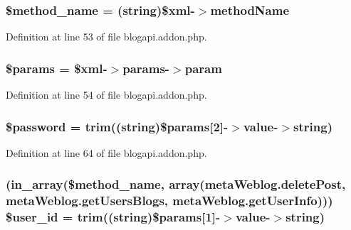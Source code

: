 \subsubsection[{\$method\+\_\+name}]{\setlength{\rightskip}{0pt plus 5cm}\$method\+\_\+name = (string)\$xml-\/$>$method\+Name}\label{blogapi_8addon_8php_a88c34f4701e451bbcef63e44e5902ebd}


Definition at line 53 of file blogapi.\+addon.\+php.

\hypertarget{blogapi_8addon_8php_afe68e6fbe7acfbffc0af0c84a1996466}{}
\subsubsection[{\$params}]{\setlength{\rightskip}{0pt plus 5cm}\$params = \$xml-\/$>$params-\/$>$param}\label{blogapi_8addon_8php_afe68e6fbe7acfbffc0af0c84a1996466}


Definition at line 54 of file blogapi.\+addon.\+php.

\hypertarget{blogapi_8addon_8php_a607686ef9f99ea7c42f4f3dd3dbb2b0d}{}
\subsubsection[{\$password}]{\setlength{\rightskip}{0pt plus 5cm}\$password = trim((string)\$params\mbox{[}2\mbox{]}-\/$>$value-\/$>$string)}\label{blogapi_8addon_8php_a607686ef9f99ea7c42f4f3dd3dbb2b0d}


Definition at line 64 of file blogapi.\+addon.\+php.

\hypertarget{blogapi_8addon_8php_a6d0a036129b3030ce289a026c5e1eff2}{}
\subsubsection[{\$user\+\_\+id}]{ (in\+\_\+array(\$method\+\_\+name, array(\textquotesingle{}meta\+Weblog.\+delete\+Post\textquotesingle{}, \textquotesingle{}meta\+Weblog.\+get\+Users\+Blogs\textquotesingle{}, \textquotesingle{}meta\+Weblog.\+get\+User\+Info\textquotesingle{}))) \${\bf user\+\_\+id} = trim((string)\$params\mbox{[}1\mbox{]}-\/$>$value-\/$>$string)}\label{blogapi_8addon_8php_a6d0a036129b3030ce289a026c5e1eff2}


